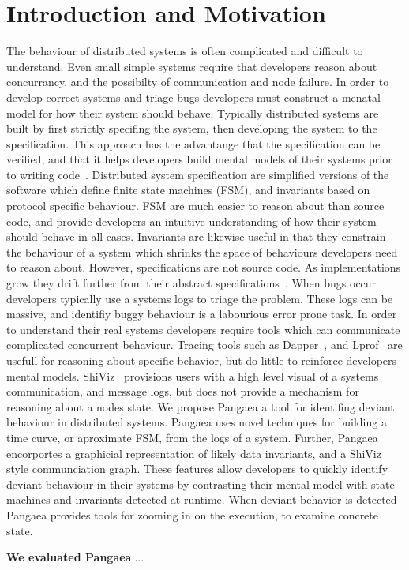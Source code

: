 \section{Introduction and Motivation}
\label{sec:intro}

The behaviour of distributed systems is often complicated and
difficult to understand. Even small simple systems require that
developers reason about concurrancy, and the possibilty of
communication and node failure. In order to develop correct systems
and triage bugs developers must construct a menatal model for how
their system should behave. Typically distributed systems are built by
first strictly specifing the system, then developing the system to the
specification. This approach has the advantange that the specification
can be verified, and that it helps developers build mental models of
their systems prior to writing
code~\cite{Newcombe:2015:AWS:2749359.2699417,WilcoxWPTWEA2015}.
Distributed system specification are simplified versions of the
software which define finite state machines (FSM), and invariants
based on protocol specific behaviour. FSM are much easier to reason
about than source code, and provide developers an intuitive
understanding of how their system should behave in all cases.
Invariants are likewise useful in that they constrain the behaviour of
a system which shrinks the space of behaviours developers need to
reason about. However, specifications are not source code. As
implementations grow they drift further from their abstract
specifications~\cite{917525}. When bugs occur developers typically use
a systems logs to triage the problem. These logs can be massive, and
identifiy buggy behaviour is a labourious error prone task.  In order
to understand their real systems developers require tools which can
communicate complicated concurrent behaviour. Tracing tools such as
Dapper~\cite{36356}, and Lprof~\cite{Zhao:2014:LNR:2685048.2685099}
are usefull for reasoning about specific behavior, but do little to
reinforce developers mental models. ShiViz~\cite{BeschastnikhWBE2016}
provisions users with a high level visual of a systems communication,
and message logs, but does not provide a mechanism for reasoning about
a nodes state. We propose Pangaea a tool for identifing deviant
behaviour in distributed systems. Pangaea uses novel techniques for
building a time curve, or aproximate FSM, from the logs of a system.
Further, Pangaea encorportes a graphicial representation of likely
data invariants, and a ShiViz style communciation graph. These
features allow developers to quickly identify deviant behaviour in
their systems by contrasting their mental model with state machines
and invariants detected at runtime. When deviant behavior is detected
Pangaea provides tools for zooming in on the execution, to examine
concrete state.



\textbf{We evaluated Pangaea$\dots$}.
